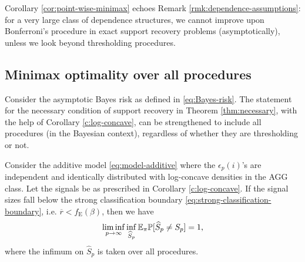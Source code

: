 \begin{remark}
Corollary \ref{cor:point-wise-minimax} echoes Remark \ref{rmk:dependence-assumptions}: for a very large class of dependence structures, we cannot improve upon Bonferroni's procedure in exact support recovery problems (asymptotically), unless we look beyond thresholding procedures.
\end{remark}



\subsection{Minimax optimality over all procedures}
\label{subsec:minimax-over-dependence}


Consider the asymptotic Bayes risk as defined in \eqref{eq:Bayes-risk}. The statement for the 
necessary condition of support recovery in Theorem \ref{thm:necessary}, with the help of Corollary 
\ref{c:log-concave}, can be strengthened to include all procedures (in the Bayesian context), regardless 
of whether they are thresholding or not.

\begin{theorem} \label{thm:necessary-strengthened}
Consider the additive model \eqref{eq:model-additive} where the $\epsilon_p(i)$'s are independent and identically distributed with log-concave densities in the AGG class. 
Let the signals be as prescribed in Corollary \ref{c:log-concave}.
If the signal sizes fall below the strong classification boundary \eqref{eq:strong-classification-boundary}, 
i.e. $\overline{r}<f_{\mathrm{E}}(\beta)$, then we have
\begin{equation} \label{eq:classification-impossible-Bayes}
    \liminf_{p\to\infty} \inf_{\widehat{S}_p} {\mathbb E}_\pi {\mathbb P}[\widehat{S}_p\neq S_p] = 1,
\end{equation}
where the infimum on $\widehat{S}_p$ is taken over all procedures.
\end{theorem}

